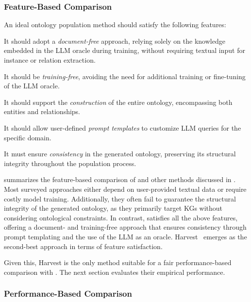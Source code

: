 \subsubsection{Feature-Based Comparison}
\label{subsubsec:comparison-features}
%

%
An ideal ontology population method should satisfy the following features:
%
\begin{featurelist}
    \item\label{itm:f1} It should adopt a \emph{document-free} approach, relying solely on the knowledge embedded in the \gls{LLM} oracle during training, without requiring textual input for instance or relation extraction.
    \item\label{itm:f2} It should be \emph{training-free}, avoiding the need for additional training or fine-tuning of the \gls{LLM} oracle.
    \item\label{itm:f3} It should support the \emph{construction} of the entire ontology, encompassing both entities and relationships.
    \item\label{itm:f4} It should allow user-defined \emph{prompt templates} to customize \gls{LLM} queries for the specific domain.
    \item\label{itm:f5} It must ensure \emph{consistency} in the generated ontology, preserving its structural integrity throughout the population process.
\end{featurelist}
%
 summarizes the feature-based comparison of \llmfkg{} and other methods discussed in .
%
Most surveyed approaches either depend on user-provided textual data or require costly model training.
%
Additionally, they often fail to guarantee the structural integrity of the generated ontology, as they primarily target \glspl{KG} without considering ontological constraints.
%
In contrast, \llmfkg{} satisfies all the above features, offering a document- and training-free approach that ensures consistency through prompt templating and the use of the \gls{LLM} as an oracle.
%
Harvest~\cite{HaoTTNSZXH23} emerges as the second-best approach in terms of feature satisfaction.

Given this, Harvest is the only method suitable for a fair performance-based comparison with \llmfkg{}.
%
The next section evaluates their empirical performance.



\subsubsection{Performance-Based Comparison}
\label{subsubsec:comparison-performance}
%


